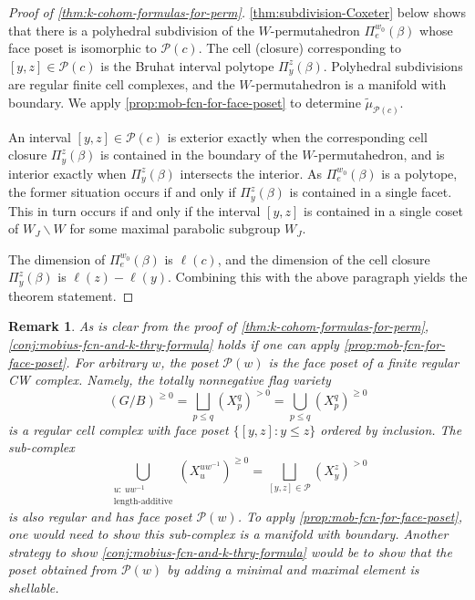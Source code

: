 \documentclass[10pt,a4paper]{amsart}
\newtheorem{remark}[Thm]{Remark}
\def\pt{\beta}
\def\calP{\mathcal{P}}
\def\mob{\tilde{\mu}}
\begin{document}
 \begin{proof}[Proof of \cref{thm:k-cohom-formulas-for-perm}]
 	\cref{thm:subdivision-Coxeter} below shows that there is a polyhedral subdivision of the $W$-permutahedron $\Pi_e^{w_0}(\pt)$ whose face poset is isomorphic to $\calP(c)$. The cell (closure) corresponding to $[y,z] \in \calP(c)$ is the Bruhat interval polytope $\Pi_y^z(\pt)$. Polyhedral subdivisions are regular finite cell complexes, and the $W$-permutahedron is a manifold with boundary. We apply \cref{prop:mob-fcn-for-face-poset} to determine $\mob_{\calP(c)}$. 
 	
 	An interval $[y,z] \in \calP(c)$ is exterior exactly when the corresponding cell closure $\Pi_y^z(\pt)$ is contained in the boundary of the $W$-permutahedron, and is interior exactly when $\Pi_y^z(\pt)$ intersects the interior. As $\Pi_e^{w_0}(\pt)$ is a polytope, the former situation occurs if and only if $\Pi_y^{z}(\pt)$ is contained in a single facet. This in turn occurs if and only if the interval $[y,z]$ is contained in a single coset of $W_J\backslash W$ for some maximal parabolic subgroup $W_J$. 
 	
 	The dimension of $\Pi_e^{w_0}(\pt)$ is $\ell(c)$, and the dimension of the cell closure $\Pi_y^z(\pt)$ is $\ell(z) - \ell(y)$. Combining this with the above paragraph yields the theorem statement.
 \end{proof}
 
 
 \begin{remark} As is clear from the proof of \cref{thm:k-cohom-formulas-for-perm}, \cref{conj:mobius-fcn-and-k-thry-formula} holds if one can apply \cref{prop:mob-fcn-for-face-poset}.
For arbitrary $w$, the poset $\calP(w)$ is the face poset of a finite regular CW complex. Namely, the totally nonnegative flag variety 
 	\[(G/B)^{\ge 0} = \bigsqcup_{p\leq q}(X_p^q)^{>0} =\bigcup_{p\leq q}(X_p^q)^{\ge 0} \]
 	is a regular cell complex \cite{GKL22} with face poset $\{[y, z]: y \leq z\}$ ordered by inclusion. The sub-complex
 	\[\bigcup_{\substack{u: ~uw^{-1}\\\text{length-additive}}} (X_u^{uw^{-1}})^{ \ge 0}= \bigsqcup_{[y,z] \in \calP} (X_y^z)^{>0}\]
 	is also regular and has face poset $\calP(w)$. To apply \cref{prop:mob-fcn-for-face-poset}, one would need to show this sub-complex is a manifold with boundary. Another strategy to show \cref{conj:mobius-fcn-and-k-thry-formula} would be to show that the poset obtained from $\calP(w)$ by adding a minimal and maximal element is shellable.
 \end{remark}
 
\end{document}
